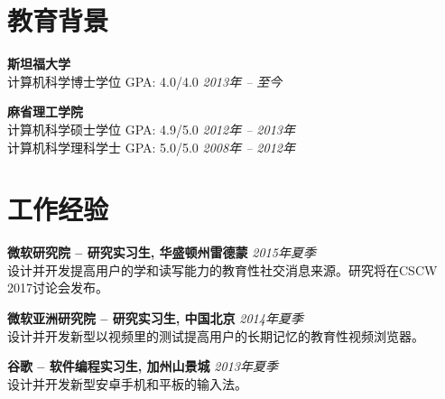 \documentclass[margin,line]{resume}
\begin{document}
\vspace{-5.0mm}

\begin{resume}

\section{\mysidestyle 教育背景}

\textbf{斯坦福大学} \vspace{0mm}\\\vspace{0mm}%
计算机科学博士学位 \hspace{4.5mm} GPA: 4.0/4.0 \hspace{5mm} \hfill \textsl{2013年 -- 至今}

\textbf{麻省理工学院} \vspace{0mm}\\\vspace{0mm}%
计算机科学硕士学位 \hspace{4.5mm} GPA: 4.9/5.0 \hspace{10mm} \hfill \textsl{2012年 -- 2013年}\\\vspace{1mm}%
计算机科学理科学士 \hspace{4.5mm} GPA: 5.0/5.0 \hfill \textsl{2008年 -- 2012年}\vspace{-0.8mm}

\section{\mysidestyle 工作经验}

\textbf{微软研究院 -- 研究实习生, 华盛顿州雷德蒙} \hspace{13.5mm} \hfill \textsl{2015年夏季}\\
设计并开发提高用户的学和读写能力的教育性社交消息来源。研究将在CSCW 2017讨论会发布。

\textbf{微软亚洲研究院 -- 研究实习生, 中国北京} \hspace{17.5mm} \hfill \textsl{2014年夏季}\\
设计并开发新型以视频里的测试提高用户的长期记忆的教育性视频浏览器。

\textbf{谷歌 -- 软件编程实习生, 加州山景城} \hspace{5mm} \hfill \textsl{2013年夏季}\\
设计并开发新型安卓手机和平板的输入法。


\end{resume}
\end{document}

